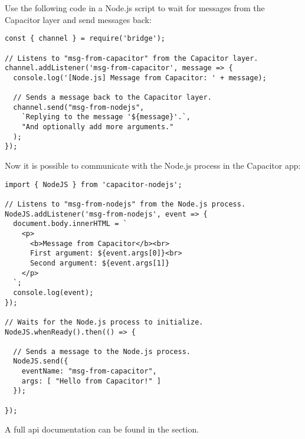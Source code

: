 Use the following code in a Node.js script to wait for messages from the Capacitor layer and send messages back:

\begin{verbatim}
const { channel } = require('bridge');

// Listens to "msg-from-capacitor" from the Capacitor layer.
channel.addListener('msg-from-capacitor', message => {
  console.log('[Node.js] Message from Capacitor: ' + message);
  
  // Sends a message back to the Capacitor layer.
  channel.send("msg-from-nodejs",
    `Replying to the message '${message}'.`,
    "And optionally add more arguments."
  );
});
\end{verbatim}

\vspace{1em}

Now it is possible to communicate with the Node.js process in the Capacitor app:

\begin{verbatim}
import { NodeJS } from 'capacitor-nodejs';

// Listens to "msg-from-nodejs" from the Node.js process.
NodeJS.addListener('msg-from-nodejs', event => {
  document.body.innerHTML = `
    <p>
      <b>Message from Capacitor</b><br>
      First argument: ${event.args[0]}<br>
      Second argument: ${event.args[1]}
    </p>
  `;
  console.log(event);
});

// Waits for the Node.js process to initialize.
NodeJS.whenReady().then(() => {

  // Sends a message to the Node.js process.
  NodeJS.send({
    eventName: "msg-from-capacitor",
    args: [ "Hello from Capacitor!" ]
  });

});
\end{verbatim}

A full \ac{api} documentation can be found in the  section.

